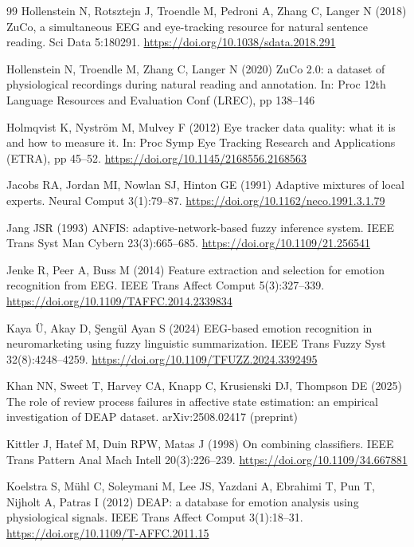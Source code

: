 \documentclass[11pt,a4paper]{article}
\begin{document}
\begin{thebibliography}{99}
 Hollenstein N, Rotsztejn J, Troendle M, Pedroni A, Zhang C, Langer N (2018) ZuCo, a simultaneous EEG and eye-tracking resource for natural sentence reading. Sci Data 5:180291. \url{https://doi.org/10.1038/sdata.2018.291}

 Hollenstein N, Troendle M, Zhang C, Langer N (2020) ZuCo 2.0: a dataset of physiological recordings during natural reading and annotation. In: Proc 12th Language Resources and Evaluation Conf (LREC), pp 138--146

 Holmqvist K, Nystr\"om M, Mulvey F (2012) Eye tracker data quality: what it is and how to measure it. In: Proc Symp Eye Tracking Research and Applications (ETRA), pp 45--52. \url{https://doi.org/10.1145/2168556.2168563}

 Jacobs RA, Jordan MI, Nowlan SJ, Hinton GE (1991) Adaptive mixtures of local experts. Neural Comput 3(1):79--87. \url{https://doi.org/10.1162/neco.1991.3.1.79}

 Jang JSR (1993) ANFIS: adaptive-network-based fuzzy inference system. IEEE Trans Syst Man Cybern 23(3):665--685. \url{https://doi.org/10.1109/21.256541}

 Jenke R, Peer A, Buss M (2014) Feature extraction and selection for emotion recognition from EEG. IEEE Trans Affect Comput 5(3):327--339. \url{https://doi.org/10.1109/TAFFC.2014.2339834}

 Kaya \"U, Akay D, \c{S}eng\"ul Ayan S (2024) EEG-based emotion recognition in neuromarketing using fuzzy linguistic summarization. IEEE Trans Fuzzy Syst 32(8):4248--4259. \url{https://doi.org/10.1109/TFUZZ.2024.3392495}

 Khan NN, Sweet T, Harvey CA, Knapp C, Krusienski DJ, Thompson DE (2025) The role of review process failures in affective state estimation: an empirical investigation of DEAP dataset. arXiv:2508.02417 (preprint)

 Kittler J, Hatef M, Duin RPW, Matas J (1998) On combining classifiers. IEEE Trans Pattern Anal Mach Intell 20(3):226--239. \url{https://doi.org/10.1109/34.667881}

 Koelstra S, M\"uhl C, Soleymani M, Lee JS, Yazdani A, Ebrahimi T, Pun T, Nijholt A, Patras I (2012) DEAP: a database for emotion analysis using physiological signals. IEEE Trans Affect Comput 3(1):18--31. \url{https://doi.org/10.1109/T-AFFC.2011.15}


\end{thebibliography}
\end{document}
